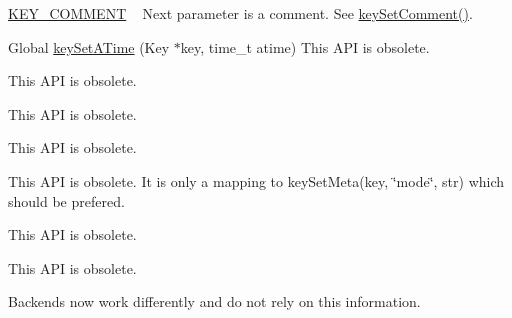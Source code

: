 \begin{DoxyRefList}
\begin{DoxyItemize}
\item \hyperlink{group__key_gga91fb3178848bd682000958089abbaf40ac29427bb47cc31689d02912e36161ee3}{K\+E\+Y\+\_\+\+C\+O\+M\+M\+E\+N\+T} ~\newline
 Next parameter is a comment. See \hyperlink{group__meta_ga8863a877a84fa46e6017fe72e49b89c1}{key\+Set\+Comment()}. 
\begin{DoxyCodeInclude}
\end{DoxyCodeInclude}
Global \hyperlink{group__meta_ga995d8b84731673c88c7c01f3fed538b9}{key\+Set\+A\+Time} (Key $\ast$key, time\+\_\+t atime) This A\+P\+I is obsolete. 
\end{DoxyItemize}
\item[\label{deprecated__deprecated000025}%
\hypertarget{deprecated__deprecated000025}{}%
Global \hyperlink{group__meta_ga9f502ecab8ab43f0b17220fcc95f3fa5}{key\+Set\+C\+Time} (Key $\ast$key, time\+\_\+t ctime)]This A\+P\+I is obsolete. 
\item[\label{deprecated__deprecated000017}%
\hypertarget{deprecated__deprecated000017}{}%
Global \hyperlink{group__meta_gaae575bd86a628a15ee45baa860522e75}{key\+Set\+Dir} (Key $\ast$key)]This A\+P\+I is obsolete. 
\item[\label{deprecated__deprecated000016}%
\hypertarget{deprecated__deprecated000016}{}%
Global \hyperlink{group__meta_ga9e3d0fb3f7ba906e067727b9155d22e3}{key\+Set\+G\+I\+D} (Key $\ast$key, gid\+\_\+t gid)]This A\+P\+I is obsolete. 
\item[\label{deprecated__deprecated000019}%
\hypertarget{deprecated__deprecated000019}{}%
Global \hyperlink{group__meta_ga8803037e35b9da1ce492323a88ff6bc3}{key\+Set\+Mode} (Key $\ast$key, mode\+\_\+t mode)]This A\+P\+I is obsolete. It is only a mapping to key\+Set\+Meta(key, \char`\"{}mode\char`\"{}, str) which should be prefered. 
\item[\label{deprecated__deprecated000023}%
\hypertarget{deprecated__deprecated000023}{}%
Global \hyperlink{group__meta_ga481d8997187992fe4bbf288bc8ef4db7}{key\+Set\+M\+Time} (Key $\ast$key, time\+\_\+t mtime)]This A\+P\+I is obsolete. 
\item[\label{deprecated__deprecated000014}%
\hypertarget{deprecated__deprecated000014}{}%
Global \hyperlink{group__meta_gab5f284f5ecd261e0a290095f50ba1af7}{key\+Set\+U\+I\+D} (Key $\ast$key, uid\+\_\+t uid)]This A\+P\+I is obsolete. 
\item[\label{deprecated__deprecated000011}%
\hypertarget{deprecated__deprecated000011}{}%
Global \hyperlink{group__keyset_ga8f210432e664d8ba06d7d55a2aba2d0f}{ks\+Need\+Sync} (const Key\+Set $\ast$ks)]Backends now work differently and do not rely on this information.
\end{DoxyRefList}